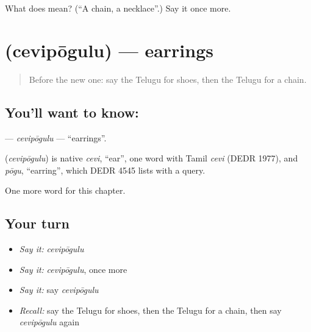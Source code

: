 \begin{tcolorbox}[breakable,colback=teal!4,colframe=teal!35!black,title={Before you move on}]
What does  mean? (\textquotedblleft{}A chain, a necklace\textquotedblright{}.) Say it once more.
\end{tcolorbox}
\section[\texorpdfstring{\te{చెవిపోగులు} (cevipōgulu)}{చెవిపోగులు (cevipōgulu)}]{ (cevipōgulu) — earrings}

\label{lesson:TE-C300-cevipogulu}



\begin{quote}
Before the new one: say the Telugu for shoes, then the Telugu for a chain.
\end{quote}

\subsection*{You'll want to know: }
\textbf{} — \emph{cevipōgulu} — \textquotedblleft{}earrings\textquotedblright{}.

\begin{cousinweb}
\textbf{} (\emph{cevipōgulu}) is native \emph{cevi}, \textquotedblleft{}ear\textquotedblright{}, one word with Tamil \emph{cevi} (DEDR 1977), and \emph{pōgu}, \textquotedblleft{}earring\textquotedblright{}, which DEDR 4545 lists with a query.
\end{cousinweb}

\begin{grammarlens}[title={What you've built}]
One more word for this chapter.
\end{grammarlens}

\subsection*{Your turn}
\begin{itemize}
\raggedright
  \item \emph{Say it:} \emph{cevipōgulu}
  \item \emph{Say it:} \emph{cevipōgulu}, once more
  \item \emph{Say it:} say \emph{cevipōgulu}
  \item \emph{Recall:} say the Telugu for shoes, then the Telugu for a chain, then say \emph{cevipōgulu} again
\end{itemize}

